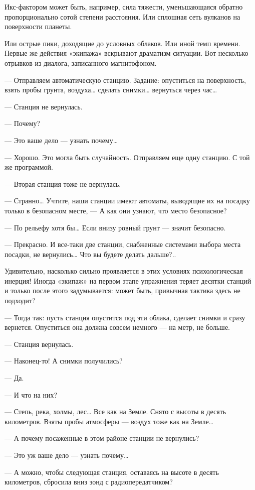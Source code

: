 Икс-фактором может  быть, например,  сила тяжести,  уменьшающаяся  обратно
пропорционально сотой степени  расстояния. Или сплошная  сеть вулканов  на
поверхности планеты.

Или острые пики,  доходящие до  условных облаков. Или  иной темп  времени.
Первые же действия «экипажа»  вскрывают драматизм ситуации. Вот  несколько
отрывков из диалога, записанного магнитофоном.

— Отправляем автоматическую станцию.  Задание: опуститься на  поверхность,
взять пробы грунта, воздуха… сделать снимки… вернуться через час…

— Станция не вернулась.

— Почему?

— Это ваше дело — узнать почему…

— Хорошо. Это могла быть случайность.  Отправляем еще одну станцию. С  той
же программой.

— Вторая станция тоже не вернулась.

— Странно… Учтите, наши  станции имеют автоматы,  выводящие их на  посадку
только в безопасном месте, — А как они узнают, что место безопасное?

— По рельефу хотя бы… Если внизу ровный грунт — значит безопасно.

— Прекрасно. И  все-таки две  станции, снабженные  системами выбора  места
посадки, не вернулись… Что вы будете делать дальше?..

Удивительно, насколько сильно проявляется в этих условиях  психологическая
инерция! Иногда «экипаж» на первом этапе упражнения теряет десятки станций
и только после этого задумывается: может быть, привычная тактика здесь  не
подходит?

— Тогда так:  пусть станция  опустится под  эти облака,  сделает снимки  и
сразу вернется. Опуститься она должна совсем немного — на метр, не больше.

— Станция вернулась.

— Наконец-то! А снимки получились?

— Да.

— И что на них?

— Степь, река,  холмы, лес…  Все как  на Земле.  Снято с  высоты в  десять
километров. Взяты пробы атмосферы — воздух тоже как на Земле…

— А почему посаженные в этом районе станции не вернулись?

— Это уж ваше дело — узнать почему…

—  А  можно,  чтобы  следующая  станция,  оставаясь  на  высоте  в  десять
километров, сбросила вниз зонд с радиопередатчиком?

